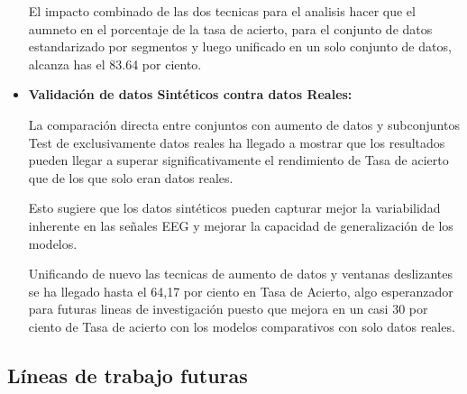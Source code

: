 \begin{itemize}

	
	El impacto combinado de las dos tecnicas para el analisis hacer que el aumneto en el porcentaje de la tasa de acierto, para el conjunto de datos estandarizado por segmentos y luego unificado en un solo conjunto de datos, alcanza has el 83.64 por ciento.
	
	
	\item
	\textbf{Validación de datos Sintéticos contra datos Reales:}


	La comparación directa entre conjuntos con aumento de datos y subconjuntos Test de exclusivamente datos reales ha llegado a mostrar que los resultados  pueden llegar a superar significativamente el rendimiento de Tasa de acierto que de los que solo eran datos reales. 
	
	Esto sugiere que los datos sintéticos pueden capturar mejor la variabilidad inherente en las señales EEG y mejorar la capacidad de generalización de los modelos.
	
	Unificando de nuevo las tecnicas de aumento de datos y ventanas deslizantes se ha llegado hasta el 64,17 por ciento en Tasa de Acierto, algo esperanzador para futuras lineas de investigación puesto que mejora en un casi 30 por ciento de Tasa de acierto con los modelos comparativos con solo datos reales.


\end{itemize}

\subsection{Líneas de trabajo futuras}